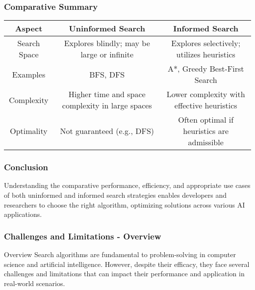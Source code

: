 \documentclass[aspectratio=169]{beamer}
\begin{document}
\begin{frame}[fragile]
    \frametitle{Comparative Summary}
    \begin{center}
        {\footnotesize
        \begin{tabular}{|c|c|c|}
            \hline
            \textbf{Aspect} & \textbf{Uninformed Search} & \textbf{Informed Search} \\
            \hline
            Search Space & Explores blindly; may be large or infinite & Explores selectively; utilizes heuristics \\
            \hline
            Examples & BFS, DFS & A*, Greedy Best-First Search \\
            \hline
            Complexity & Higher time and space complexity in large spaces & Lower complexity with effective heuristics \\
            \hline
            Optimality & Not guaranteed (e.g., DFS) & Often optimal if heuristics are admissible \\
            \hline
        \end{tabular}
        }
    \end{center}
\end{frame}

\begin{frame}[fragile]
    \frametitle{Conclusion}
    Understanding the comparative performance, efficiency, and appropriate use cases of both uninformed and informed search strategies enables developers and researchers to choose the right algorithm, optimizing solutions across various AI applications.
\end{frame}

\begin{frame}[fragile]
    \frametitle{Challenges and Limitations - Overview}
    \begin{block}{Overview}
        Search algorithms are fundamental to problem-solving in computer science and artificial intelligence. However, despite their efficacy, they face several challenges and limitations that can impact their performance and application in real-world scenarios.
    \end{block}
\end{frame}
\end{document}
